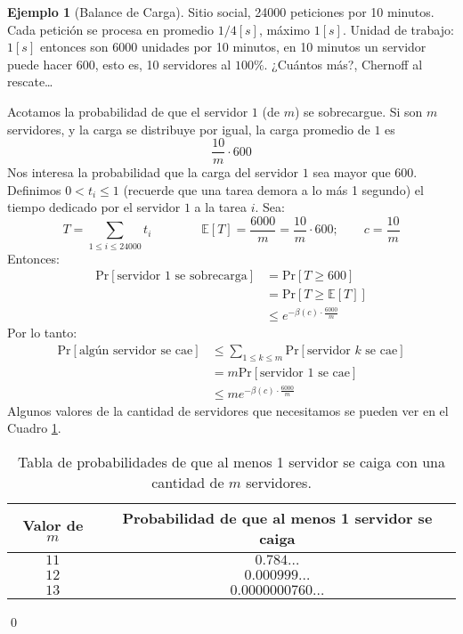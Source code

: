 \documentclass[english, spanish, fleqn, 10pt]{article}
\numberwithin{equation}{section}
\newcommand{\nparentesis}[1]{\left( #1 \right)}
\newcommand{\ncorchetes}[1]{\left[ #1 \right]}
\theoremstyle{definition}
\newtheorem{beforeExample}{Ejemplo}[section]
\newenvironment{ejemplo}[1][]{\begin{beforeExample}[#1]\renewcommand{\qedsymbol}{$\blacksquare$}}{\qed\end{beforeExample}}
\begin{document}
\begin{ejemplo}[Balance de Carga]
	Sitio social, 24000 peticiones por 10 minutos. Cada petición se procesa en promedio $1/4\ncorchetes{s}$, máximo $1\ncorchetes{s}$. Unidad de trabajo: $1\ncorchetes{s}$ entonces son 6000 unidades por 10 minutos, en 10 minutos un servidor puede hacer 600, esto es, 10 servidores al $100\%$. ¿Cuántos más?, Chernoff al rescate\ldots 
	
	Acotamos la probabilidad de que el servidor $1$ (de $m$) se sobrecargue. Si son $m$ servidores, y la carga se distribuye por igual, la carga promedio de $1$ es
	\newcommand{\pr}[1]{\mathrm{Pr}\ncorchetes{#1}}
	\newcommand{\esperanza}[1]{\mathbb{E}\ncorchetes{#1}}
	\begin{equation*}
	\dfrac{10}{m}\cdot 600
	\end{equation*}
	Nos interesa la probabilidad que la carga del servidor $1$ sea mayor que $600$. Definimos $0<t_i\leq 1$ (recuerde que una tarea demora a lo más 1 segundo) el tiempo dedicado por el servidor $1$ a la tarea $i$. Sea:
	\begin{equation*}
	T=\sum_{1\leq i \leq 24000} t_i\qquad\qquad \esperanza{T}=\dfrac{6000}{m} = \dfrac{10}{m}\cdot 600; \qquad c = \dfrac{10}{m}
	\end{equation*}
	Entonces:
	\begin{align*}
	\pr{\text{servidor 1 se sobrecarga}} &= \pr{T \geq 600}\\
	&= \pr{T \geq \esperanza{T}}\\
	&\leq e^{-\beta \nparentesis{c}\cdot \frac{6000}{m}}
	\end{align*}
	Por lo tanto:
	\begin{align*}
	\pr{\text{algún servidor se cae}} &\leq \sum_{1 \leq k \leq m} \pr{\text{servidor $k$ se cae}}\\
	&=m \pr{\text{servidor 1 se cae}}\\
	&\leq m e^{-\beta\nparentesis{c}\cdot \frac{6000}{m}}
	\end{align*}
	Algunos valores de la cantidad de servidores que necesitamos se pueden ver en el Cuadro \ref{29::TablaProbabilidad}.
	\begin{table}[!h]
		\centering
		\begin{tabular}{c|c}
			Valor de $m$ & Probabilidad de que al menos 1 servidor se caiga\\
			\hline
			$11$ & $0.784\ldots$\\
			$12$ & $0.000999\ldots$\\
			$13$ & $0.0000000760\ldots$
		\end{tabular}
		\caption{Tabla de probabilidades de que al menos 1 servidor se caiga con una cantidad de $m$ servidores.}
		\label{29::TablaProbabilidad}
	\end{table}
	
\end{ejemplo}
\end{document}
